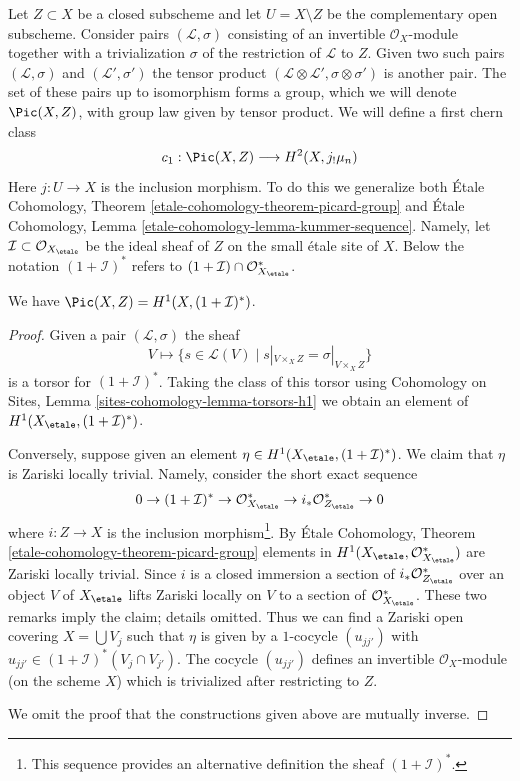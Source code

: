 \medskip\noindent
Let $Z \subset X$ be a closed subscheme and let $U = X \setminus Z$
be the complementary open subscheme. Consider pairs
$(\mathcal{L}, \sigma)$ consisting of an invertible
$\mathcal{O}_X$-module together with a trivialization
$\sigma$ of the restriction of $\mathcal{L}$ to $Z$.
Given two such pairs $(\mathcal{L}, \sigma)$ and $(\mathcal{L}', \sigma')$
the tensor product $(\mathcal{L} \otimes \mathcal{L}', \sigma \otimes \sigma')$
is another pair. The set of these pairs up to isomorphism forms a group,
which we will denote $\Pic(X, Z)$, with group law given by tensor product.
We will define a first chern class
$$
c_1 : \Pic(X, Z) \longrightarrow H^2(X, j_!\mu_n)
$$
Here $j : U \to X$ is the inclusion morphism. To do this we generalize both
\'Etale Cohomology, Theorem \ref{etale-cohomology-theorem-picard-group} and
\'Etale Cohomology, Lemma \ref{etale-cohomology-lemma-kummer-sequence}.
Namely, let $\mathcal{I} \subset \mathcal{O}_{X_\etale}$
be the ideal sheaf of $Z$ on the small \'etale site of $X$. Below the
notation $(1 + \mathcal{I})^*$ refers to
$(1 + \mathcal{I}) \cap \mathcal{O}_{X_\etale}^*$.

\begin{lemma}
\label{lemma-picard-group-extended}
We have $\Pic(X, Z) = H^1(X, (1 + \mathcal{I})^*)$.
\end{lemma}

\begin{proof}
Given a pair $(\mathcal{L}, \sigma)$ the sheaf
$$
V \longmapsto \{s \in \mathcal{L}(V) \mid s|_{V \times_X Z} = \sigma|_{V \times_X Z}\}
$$
is a torsor for $(1 + \mathcal{I})^*$. Taking the class of this
torsor using Cohomology on Sites, Lemma \ref{sites-cohomology-lemma-torsors-h1}
we obtain an element of $H^1(X_\etale, (1 + \mathcal{I})^*)$.

\medskip\noindent
Conversely, suppose given an element
$\eta \in H^1(X_\etale, (1 + \mathcal{I})^*)$.
We claim that $\eta$ is Zariski locally trivial.
Namely, consider the short exact sequence
$$
0 \to (1 + \mathcal{I})^* \to \mathcal{O}_{X_\etale}^* \to
i_*\mathcal{O}_{Z_\etale}^* \to 0
$$
where $i : Z \to X$ is the inclusion morphism\footnote{This sequence
provides an alternative definition the sheaf $(1 + \mathcal{I})^*$.}.
By \'Etale Cohomology, Theorem \ref{etale-cohomology-theorem-picard-group}
elements in $H^1(X_\etale, \mathcal{O}_{X_\etale}^*)$ are Zariski
locally trivial. Since $i$ is a closed immersion a section
of $i_*\mathcal{O}_{Z_\etale}^*$ over an object $V$ of $X_\etale$
lifts Zariski locally on $V$ to a section of $\mathcal{O}_{X_\etale}^*$.
These two remarks imply the claim; details omitted. Thus we can find a Zariski
open covering $X = \bigcup V_j$ such that $\eta$ is given by
a $1$-cocycle $(u_{jj'})$ with
$u_{jj'} \in (1 + \mathcal{I})^*(V_j \cap V_{j'})$.
The cocycle $(u_{jj'})$ defines an invertible $\mathcal{O}_X$-module
(on the scheme $X$) which is trivialized after restricting to $Z$.

\medskip\noindent
We omit the proof that the constructions given above are mutually inverse.
\end{proof}


